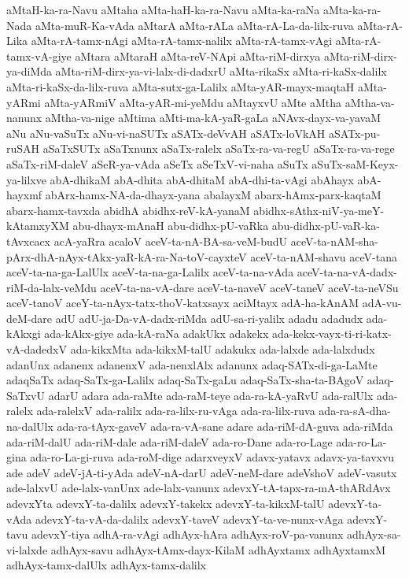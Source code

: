 {aMtaH-ka-ra-Navu
aMtaha
aMta-haH-ka-ra-Navu
aMta-ka-raNa
aMta-ka-ra-Nada
aMta-muR-Ka-vAda
aMtarA
aMta-rALa
aMta-rA-La-da-lilx-ruva
aMta-rA-Lika
aMta-rA-tamx-nAgi
aMta-rA-tamx-nalilx
aMta-rA-tamx-vAgi
aMta-rA-tamx-vA-giye
aMtara
aMtaraH
aMta-reV-NApi
aMta-riM-dirxya
aMta-riM-dirx-ya-diMda
aMta-riM-dirx-ya-vi-lalx-di-dadxrU
aMta-rikaSx
aMta-ri-kaSx-dalilx
aMta-ri-kaSx-da-lilx-ruva
aMta-sutx-ga-Lalilx
aMta-yAR-mayx-maqtaH
aMta-yARmi
aMta-yARmiV
aMta-yAR-mi-yeMdu
aMtayxvU
aMte
aMtha
aMtha-va-nanunx
aMtha-va-nige
aMtima
aMti-ma-kA-yaR-gaLa
aNAvx-dayx-va-yavaM
aNu
aNu-vaSuTx
aNu-vi-naSUTx
aSATx-deVvAH
aSATx-loVkAH
aSATx-pu-ruSAH
aSaTxSUTx
aSaTxnunx
aSaTx-ralelx
aSaTx-ra-va-regU
aSaTx-ra-va-rege
aSaTx-riM-daleV
aSeR-ya-vAda
aSeTx
aSeTxV-vi-naha
aSuTx
aSuTx-saM-Keyx-ya-lilxve
abA-dhikaM
abA-dhita
abA-dhitaM
abA-dhi-ta-vAgi
abAhayx
abA-hayxmf
abArx-hamx-NA-da-dhayx-yana
abalayxM
abarx-hAmx-parx-kaqtaM
abarx-hamx-tavxda
abidhA
abidhx-reV-kA-yanaM
abidhx-sAthx-niV-ya-meY-kAtamxyXM
abu-dhayx-mAnaH
abu-didhx-pU-vaRka
abu-didhx-pU-vaR-ka-tAvxcacx
acA-yaRra
acaloV
aceV-ta-nA-BA-sa-veM-budU
aceV-ta-nAM-sha-pArx-dhA-nAyx-tAkx-yaR-kA-ra-Na-toV-cayxteV
aceV-ta-nAM-shavu
aceV-tana
aceV-ta-na-ga-LalUlx
aceV-ta-na-ga-Lalilx
aceV-ta-na-vAda
aceV-ta-na-vA-dadx-riM-da-lalx-veMdu
aceV-ta-na-vA-dare
aceV-ta-naveV
aceV-taneV
aceV-ta-neVSu
aceV-tanoV
aceY-ta-nAyx-tatx-thoV-katxsayx
aciMtayx
adA-ha-kAnAM
adA-vu-deM-dare
adU
adU-ja-Da-vA-dadx-riMda
adU-sa-ri-yalilx
adadu
adadudx
ada-kAkxgi
ada-kAkx-giye
ada-kA-raNa
adakUkx
adakekx
ada-kekx-vayx-ti-ri-katx-vA-dadedxV
ada-kikxMta
ada-kikxM-talU
adakukx
ada-lalxde
ada-lalxdudx
adanUnx
adanenx
adanenxV
ada-nenxlAlx
adanunx
adaq-SATx-di-ga-LaMte
adaqSaTx
adaq-SaTx-ga-Lalilx
adaq-SaTx-gaLu
adaq-SaTx-sha-ta-BAgoV
adaq-SaTxvU
adarU
adara
ada-raMte
ada-raM-teye
ada-ra-kA-yaRvU
ada-ralUlx
ada-ralelx
ada-ralelxV
ada-ralilx
ada-ra-lilx-ru-vAga
ada-ra-lilx-ruva
ada-ra-sA-dha-na-dalUlx
ada-ra-tAyx-gaveV
ada-ra-vA-sane
adare
ada-riM-dA-guva
ada-riMda
ada-riM-dalU
ada-riM-dale
ada-riM-daleV
ada-ro-Dane
ada-ro-Lage
ada-ro-La-gina
ada-ro-La-gi-ruva
ada-roM-dige
adarxveyxV
adavx-yatavx
adavx-ya-tavxvu
ade
adeV
adeV-jA-ti-yAda
adeV-nA-darU
adeV-neM-dare
adeVshoV
adeV-vasutx
ade-lalxvU
ade-lalx-vanUnx
ade-lalx-vanunx
adevxY-tA-tapx-ra-mA-thARdAvx
adevxYta
adevxY-ta-dalilx
adevxY-takekx
adevxY-ta-kikxM-talU
adevxY-ta-vAda
adevxY-ta-vA-da-dalilx
adevxY-taveV
adevxY-ta-ve-nunx-vAga
adevxY-tavu
adevxY-tiya
adhA-ra-vAgi
adhAyx-hAra
adhAyx-roV-pa-vanunx
adhAyx-sa-vi-lalxde
adhAyx-savu
adhAyx-tAmx-dayx-KilaM
adhAyxtamx
adhAyxtamxM
adhAyx-tamx-dalUlx
adhAyx-tamx-dalilx
}
